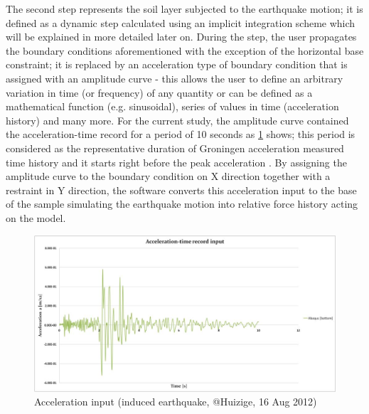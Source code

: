 	
	The second step represents the soil layer subjected to the earthquake motion; it is defined as a dynamic step calculated using an implicit integration scheme which will be explained in more detailed later on. During the step, the user propagates the boundary conditions aforementioned with the exception of the horizontal base constraint; it is replaced by an acceleration type of boundary condition that is assigned with an amplitude curve - this allows the user to define an arbitrary variation in time (or frequency) of any quantity or can be defined as a mathematical function (e.g. sinusoidal), series of values in time (acceleration history) and many more. For the current study, the amplitude curve contained the acceleration-time record for a period of 10 seconds as \ref{Acceleration} shows; this period is considered as the representative duration of Groningen acceleration measured time history and it starts right before the peak acceleration \cite{dost2004scaling}. By assigning the amplitude curve to the boundary condition on X direction together with a restraint in Y direction, the software converts this acceleration input to the base of the sample simulating the earthquake motion into relative force history acting on the model.
	
	\begin{figure}[h!]
		\centering
		\includegraphics[width=0.7\linewidth]{"Acc input"}
		\caption{Acceleration input (induced earthquake, @Huizige, 16 Aug 2012)}
		\label{Acceleration}
	\end{figure}
	
	\newpage
